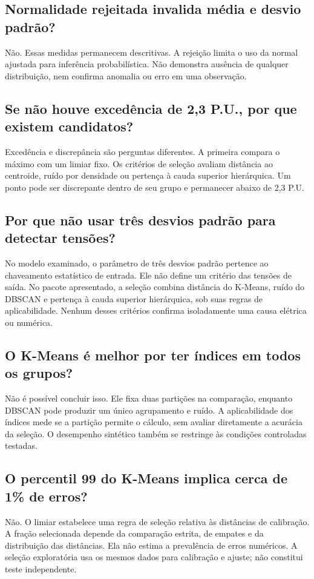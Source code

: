\documentclass[11pt,a4paper]{article}
\begin{document}
\subsection*{Normalidade rejeitada invalida média e desvio padrão?}
Não. Essas medidas permanecem descritivas. A rejeição limita o uso da
normal ajustada para inferência probabilística. Não demonstra ausência
de qualquer distribuição, nem confirma anomalia ou erro em uma observação.

\subsection*{Se não houve excedência de 2,3 P.U., por que existem candidatos?}
Excedência e discrepância são perguntas diferentes. A primeira compara
o máximo com um limiar fixo. Os critérios de seleção avaliam distância
ao centroide, ruído por densidade ou pertença à cauda superior hierárquica.
Um ponto pode
ser discrepante dentro de seu grupo e permanecer abaixo de 2,3 P.U.

\subsection*{Por que não usar três desvios padrão para detectar tensões?}
No modelo examinado, o parâmetro de três desvios padrão pertence ao
chaveamento estatístico de entrada. Ele não define um critério das tensões
de saída. No pacote apresentado, a seleção combina distância do
K-Means, ruído do DBSCAN e pertença à cauda superior hierárquica,
sob suas regras de aplicabilidade. Nenhum desses critérios confirma
isoladamente uma causa elétrica ou numérica.

\subsection*{O K-Means é melhor por ter índices em todos os grupos?}
Não é possível concluir isso. Ele fixa duas partições na comparação,
enquanto DBSCAN pode produzir um único agrupamento e ruído. A
aplicabilidade dos índices mede se a partição permite o cálculo,
sem avaliar diretamente a acurácia da seleção. O desempenho sintético
também se restringe às condições controladas testadas.

\subsection*{O percentil 99 do K-Means implica cerca de 1\% de erros?}
Não. O limiar estabelece uma regra de seleção relativa às distâncias
de calibração. A fração selecionada depende da comparação estrita,
de empates e da distribuição das distâncias. Ela não estima a
prevalência de erros numéricos. A seleção exploratória usa os mesmos
dados para calibração e ajuste; não constitui teste independente.
\end{document}
